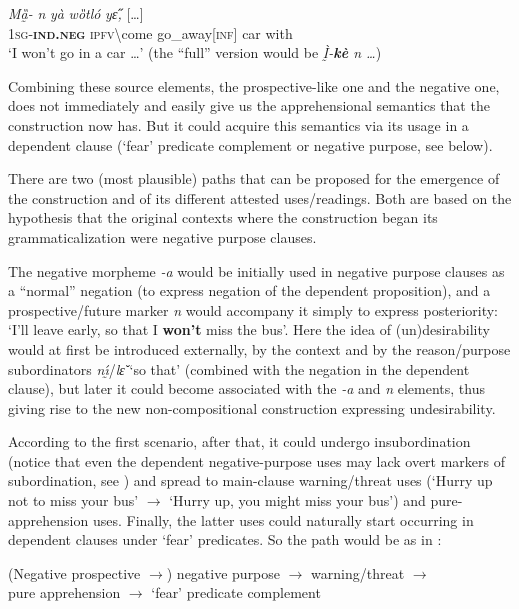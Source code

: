 \documentclass[output=paper,colorlinks,citecolor=brown
]{langscibook}
\begin{document}
\ea \label{ex:Fed68}
\gll \textit{Mȁ̰-\textbf{{\à}}} \textit{n{\ù}} \textit{yà} \textit{wȍtló} \textit{yɛ̋,} \textup{[}\ldots\textup{]} \\
\textsc{1sg-\textbf{ind.neg}} \textsc{ipfv\backslash}come go\_away[\textsc{inf}] car with \\
\glt `I won't go in a car {\dots'} (the ``full'' version would be \textit{Ḭ̀-\textbf{kè} n{\ù} {\dots}})
\z


 Combining these source elements, the prospective-like one and the negative one, does not immediately and easily give us the apprehensional semantics that the construction now has. But it could acquire this semantics via its usage in a dependent clause (`fear' predicate complement or negative purpose, see below).

There are two (most plausible) paths that can be proposed for the emergence of the construction and of its different attested uses\slash readings. Both are based on the hypothesis that the original contexts where the construction began its grammaticalization were negative purpose clauses.

The negative morpheme \textit{\text{*}-a} would be initially used in negative purpose clauses as a ``normal'' negation (to express negation of the dependent proposition), and a prospective\slash future marker \textit{n{\ù}} would accompany it simply to express posteriority: `I'll leave early, so that I \textbf{won't} miss the bus'. Here the idea of (un)desirability would at first be introduced externally, by the context and by the reason\slash purpose subordinators \textit{nı̰́}\slash\textit{lɛ̌} `so that' (combined with the negation in the dependent clause), but later it could become associated with the \textit{\text{*}-a} and \textit{n{\ù}} elements, thus giving rise to the new non-compositional construction expressing undesirability.

According to the first scenario, after that, it could undergo insubordination (notice that even the dependent negative-purpose uses may lack overt markers of subordination, see ) and spread to main-clause warning\slash threat uses (`Hurry up not to miss your bus' $\rightarrow$ `Hurry up, you might miss your bus') and pure\hyp apprehension uses. Finally, the latter uses could naturally start occurring in dependent clauses under `fear' predicates. So the path would be as in :

\ea\label{path1} \textnormal{(Negative prospective $\rightarrow$) negative purpose $\rightarrow$ warning\slash threat $\rightarrow$  \\
pure apprehension $\rightarrow$ `fear' predicate complement}
\z
\end{document}
